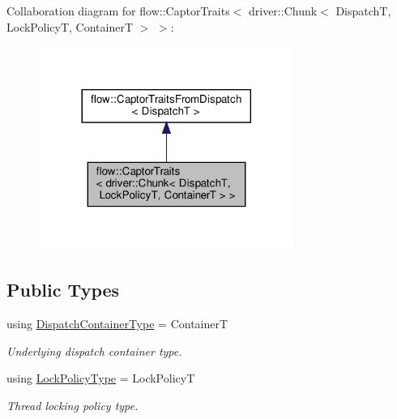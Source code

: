 Collaboration diagram for flow\+:\+:Captor\+Traits$<$ driver\+:\+:Chunk$<$ DispatchT, Lock\+PolicyT, ContainerT $>$ $>$\+:
\nopagebreak
\begin{figure}[H]
\begin{center}
\leavevmode
\includegraphics[width=236pt]{structflow_1_1_captor_traits_3_01driver_1_1_chunk_3_01_dispatch_t_00_01_lock_policy_t_00_01_container_t_01_4_01_4__coll__graph}
\end{center}
\end{figure}
\subsection*{Public Types}
\begin{DoxyCompactItemize}
\item 
\mbox{\label{structflow_1_1_captor_traits_3_01driver_1_1_chunk_3_01_dispatch_t_00_01_lock_policy_t_00_01_container_t_01_4_01_4_a527163b458da2f4f3c644128d1aeb819}} 
using \hyperlink{structflow_1_1_captor_traits_3_01driver_1_1_chunk_3_01_dispatch_t_00_01_lock_policy_t_00_01_container_t_01_4_01_4_a527163b458da2f4f3c644128d1aeb819}{Dispatch\+Container\+Type} = ContainerT
\begin{DoxyCompactList}\small\item\em Underlying dispatch container type. \end{DoxyCompactList}\item 
\mbox{\label{structflow_1_1_captor_traits_3_01driver_1_1_chunk_3_01_dispatch_t_00_01_lock_policy_t_00_01_container_t_01_4_01_4_ae0fd66188ae32dd82d9b03de36747845}} 
using \hyperlink{structflow_1_1_captor_traits_3_01driver_1_1_chunk_3_01_dispatch_t_00_01_lock_policy_t_00_01_container_t_01_4_01_4_ae0fd66188ae32dd82d9b03de36747845}{Lock\+Policy\+Type} = Lock\+PolicyT
\begin{DoxyCompactList}\small\item\em Thread locking policy type. \end{DoxyCompactList}\end{DoxyCompactItemize}


